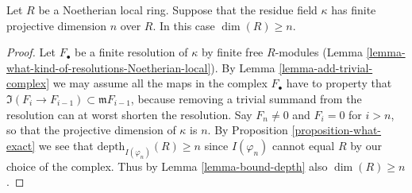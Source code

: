 \begin{lemma}
\label{lemma-dim-gl-dim}
Let $R$ be a Noetherian local ring.
Suppose that the residue field $\kappa$ has finite
projective dimension $n$ over $R$.
In this case $\dim(R) \geq n$.
\end{lemma}

\begin{proof}
Let $F_{\bullet}$ be a finite resolution of $\kappa$ by finite free
$R$-modules (Lemma \ref{lemma-what-kind-of-resolutions-Noetherian-local}).
By Lemma \ref{lemma-add-trivial-complex}
we may assume all the maps in the complex $F_{\bullet}$
have to property that $\Im(F_i \to F_{i-1})
\subset \mathfrak m F_{i-1}$, because removing a trivial
summand from the resolution can at worst shorten the resolution.
Say $F_n \not = 0$ and $F_i = 0$ for $i > n$, so that
the projective dimension of $\kappa$ is $n$.
By Proposition \ref{proposition-what-exact} we see that
$\text{depth}_{I(\varphi_n)}(R) \geq n$ since $I(\varphi_n)$
cannot equal $R$ by our choice of the complex.
Thus by Lemma \ref{lemma-bound-depth} also $\dim(R) \geq n$.
\end{proof}
